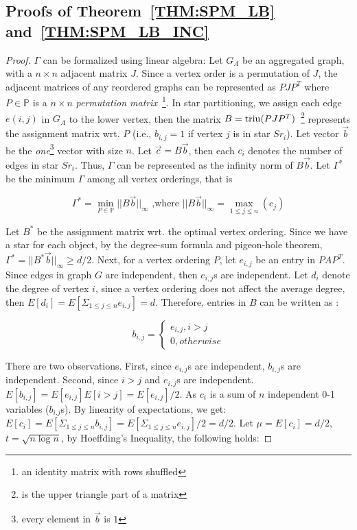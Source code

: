 \subsection{Proofs of Theorem~\ref{THM:SPM_LB} and~\ref{THM:SPM_LB_INC}}
\label{apx:thm2proof}

\begin{proof}
$\Gamma$ can be formalized using linear algebra:
Let $G_A$ be an aggregated graph, with a $n \times n$ adjacent matrix $J$.
Since a vertex order is a permutation of $J$, the adjacent matrices 
of any reordered graphs can be represented as $PJP^T$
where $P \in \mathbb{P}$ is a $n\times n$ \emph{permutation matrix}~\footnote{an identity matrix with rows shuffled}.
In star partitioning, we assign each edge $e(i,j)$ in $G_A$ to the lower vertex, 
then the matrix $B=\operatorname*{triu}(PJP^T)$~\footnote{ is the upper triangle part of a matrix}
represents the assignment matrix wrt. $P$ (i.e., $b_{i,j} = 1$ if vertex $j$ is in star $Sr_i$).
Let vector $\vec{b}$ be the \textit{one}\footnote{every element in $\vec{b}$ is $1$} 
vector with size $n$. Let $\vec{c} = B\vec{b}$, then each $c_i$ 
denotes the number of edges in star $Sr_i$. Thus, $\Gamma$ can be represented
as the infinity norm of $B\vec{b}$. Let $\Gamma^*$ be the minimum $\Gamma$ among all vertex orderings, that is

\begin{equation}
\Gamma^* = \min_{P \in \mathbb{P}}{||B\vec{b}||_\infty} \text{ ,where } ||B\vec{b}||_\infty = \max_{1\leq j \leq n}(c_j)
\end{equation}

Let $B^*$ be the assignment matrix wrt. the optimal vertex ordering.
Since we have a star for each object, by the degree-sum formula and pigeon-hole theorem, 
$\Gamma^*=||B^*\vec{b}||_\infty \geq d/2$.
Next, for a vertex ordering $P$, let $e_{i,j}$ be an entry in $PAP^T$. Since 
edges in graph $G$ are independent, then $e_{i,j}$s are independent. 
Let $d_i$ denote the degree of vertex $i$, since a vertex ordering does not
affect the average degree,
then $E[d_i]=E[\Sigma_{1\leq j \leq n}e_{i,j}]=d$. Therefore, 
entries in $B$ can be written as :

\begin{equation*}
b_{i,j} = \begin{cases}
			e_{i,j}, i>j \\
			0, otherwise
		  \end{cases}  
\end{equation*}

There are two observations. First, since $e_{i,j}$s are independent,
$b_{i,j}$s are independent. Second, since $i>j$ and $e_{i,j}$s are independent. 
$E[b_{i,j}] = E[e_{i,j}]E[i>j]= E[e_{i,j}]/2$.
As $c_i$ is a sum of $n$ independent 0-1 variables ($b_{i.j}$s). By linearity 
of expectations,
we get: $E[c_i] = E[\Sigma_{1\leq j \leq n} b_{i,j}]=E[\Sigma_{1\leq j \leq n} e_{i,j}]/2 = d/2$.
 Let $\mu =E[c_i] = d/2$, 
$t = \sqrt{n\log n}$, by Hoeffding's Inequality, the following holds:


\end{proof}

